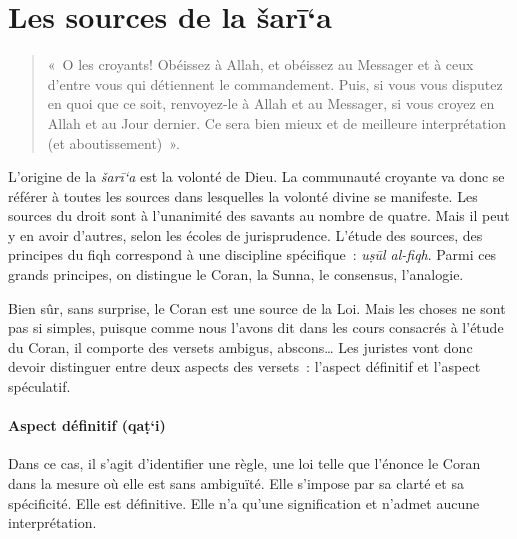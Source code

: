 \section{Les sources de la šarī`a
} 
\begin{quote}
\end{quote}
\begin{quote}
«~O les croyants! Obéissez à Allah, et obéissez au Messager et à ceux
d'entre vous qui détiennent le commandement. Puis, si vous vous disputez
en quoi que ce soit, renvoyez-le à Allah et au Messager, si vous croyez
en Allah et au Jour dernier. Ce sera bien mieux et de meilleure
interprétation (et aboutissement)~». 
\end{quote}

L'origine de la \emph{šarī`a} est la volonté de Dieu. La communauté
croyante va donc se référer à toutes les sources dans lesquelles la
volonté divine se manifeste. Les sources du droit sont à l'unanimité des
savants au nombre de quatre. Mais il peut y en avoir d'autres, selon les
écoles de jurisprudence. L'étude des sources, des principes du fiqh
correspond à une discipline spécifique~: \emph{uṣūl al-fiqh}. Parmi ces
grands principes, on distingue le Coran, la Sunna, le consensus,
l'analogie.


Bien sûr, sans surprise, le Coran est une source de la Loi. Mais les
choses ne sont pas si simples, puisque comme nous l'avons dit dans les
cours consacrés à l'étude du Coran, il comporte des versets ambigus,
abscons\ldots{} Les juristes vont donc devoir distinguer entre deux
aspects des versets~: l'aspect définitif et l'aspect spéculatif.

 
\paragraph{Aspect définitif
(qaṭ`i)} 

Dans ce cas, il s'agit d'identifier une règle, une loi telle que
l'énonce le Coran dans la mesure où elle est sans ambiguïté. Elle
s'impose par sa clarté et sa spécificité. Elle est définitive. Elle n'a
qu'une signification et n'admet aucune interprétation.

